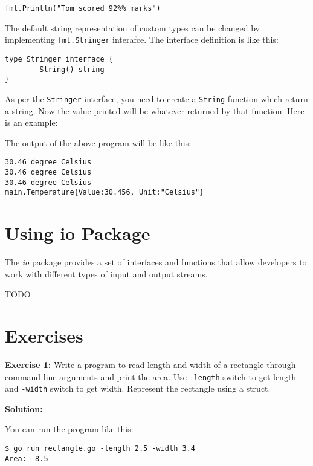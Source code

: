 \begin{lstlisting}[numbers=none]
        fmt.Println("Tom scored 92%% marks")
\end{lstlisting}

The default string representation of custom types can be changed by
implementing \texttt{fmt.Stringer} interafce.  The interface
definition is like this:

\begin{lstlisting}[numbers=none]
type Stringer interface {
        String() string
}
\end{lstlisting}

As per the \texttt{Stringer} interface, you need to create
a \texttt{String} function which return a string.  Now the value
printed will be whatever returned by that function.  Here is an
example:



The output of the above program will be like this:

\begin{lstlisting}[numbers=none]
30.46 degree Celsius
30.46 degree Celsius
30.46 degree Celsius
main.Temperature{Value:30.456, Unit:"Celsius"}
\end{lstlisting}

\section{Using io Package}

The \textit{io} package provides a set of interfaces and functions that allow
developers to work with different types of input and output streams.

TODO

\section{Exercises}

{\bfseries Exercise 1:} Write a program to read length and width of a
rectangle through command line arguments and print the area.
Use \texttt{-length} switch to get length and \texttt{-width} switch
to get width.  Represent the rectangle using a struct.

\textbf{Solution:}



You can run the program like this:

\begin{lstlisting}[numbers=none]
$ go run rectangle.go -length 2.5 -width 3.4
Area:  8.5
\end{lstlisting}

